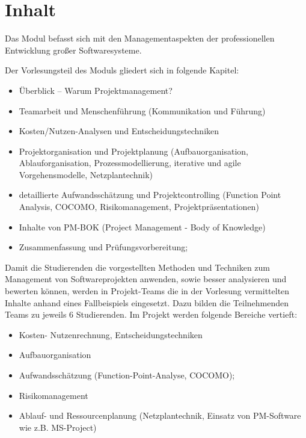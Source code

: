 \hypertarget{inhaltpathlabelmi-2017modulbeschreibungen-bachelorba_projektmanagement}{%
\section*{Inhalt\label{/mi-2017/modulbeschreibungen-bachelor/BA_Projektmanagement}}\label{inhaltpathlabelmi-2017modulbeschreibungen-bachelorba_projektmanagement}}

Das Modul befasst sich mit den Managementaspekten der professionellen
Entwicklung großer Softwaresysteme.

Der Vorlesungsteil des Moduls gliedert sich in folgende Kapitel:

\begin{itemize}
\tightlist
\item
  Überblick -- Warum Projektmanagement?
\item
  Teamarbeit und Menschenführung (Kommunikation und Führung)
\item
  Kosten/Nutzen-Analysen und Entscheidungstechniken
\item
  Projektorganisation und Projektplanung (Aufbauorganisation,
  Ablauforganisation, Prozessmodellierung, iterative und agile
  Vorgehensmodelle, Netzplantechnik)
\item
  detaillierte Aufwandsschätzung und Projektcontrolling (Function Point
  Analysis, COCOMO, Risikomanagement, Projektpräsentationen)
\item
  Inhalte von PM-BOK (Project Management - Body of Knowledge)
\item
  Zusammenfassung und Prüfungsvorbereitung;
\end{itemize}

Damit die Studierenden die vorgestellten Methoden und Techniken zum
Management von Softwareprojekten anwenden, sowie besser analysieren und
bewerten können, werden in Projekt-Teams die in der Vorlesung
vermittelten Inhalte anhand eines Fallbeispiels eingesetzt. Dazu bilden
die Teilnehmenden Teams zu jeweils 6 Studierenden. Im Projekt werden
folgende Bereiche vertieft:

\begin{itemize}
\tightlist
\item
  Kosten- Nutzenrechnung, Entscheidungstechniken
\item
  Aufbauorganisation
\item
  Aufwandsschätzung (Function-Point-Analyse, COCOMO);
\item
  Risikomanagement
\item
  Ablauf- und Ressourcenplanung (Netzplantechnik, Einsatz von
  PM-Software wie z.B. MS-Project)
\end{itemize}


